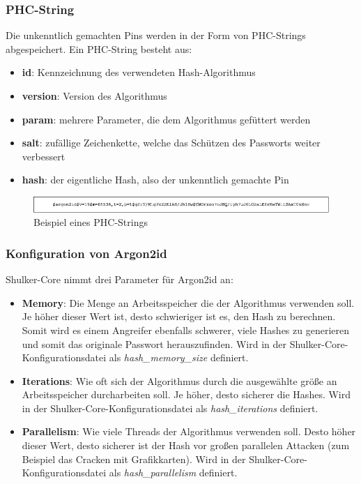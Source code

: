 \subsubsection{PHC-String}
Die unkenntlich gemachten Pins werden in der Form von PHC-Strings abgespeichert. Ein PHC-String besteht aus:
\begin{itemize}
    \item \textbf{id}: Kennzeichnung des verwendeten Hash-Algorithmus
    \item \textbf{version}: Version des Algorithmus
    \item \textbf{param}: mehrere Parameter, die dem Algorithmus gefüttert werden
    \item \textbf{salt}: zufällige Zeichenkette, welche das Schützen des Passworts weiter verbessert
    \item \textbf{hash}: der eigentliche Hash, also der unkenntlich gemachte Pin
\end{itemize}
\begin{figure}[H]
    \begin{center}
        \includegraphics[width=1\textwidth]{images/core/phc_string.png}
        \caption{Beispiel eines PHC-Strings}
    \end{center}
\end{figure}

\subsubsection{Konfiguration von Argon2id}
Shulker-Core nimmt drei Parameter für Argon2id an:

\begin{itemize}
    \item \textbf{Memory}: Die Menge an Arbeitsspeicher die der Algorithmus verwenden soll. Je höher dieser Wert ist,
    desto schwieriger ist es, den Hash zu berechnen. Somit wird es einem Angreifer ebenfalls schwerer, viele Hashes zu generieren
    und somit das originale Passwort herauszufinden. Wird in der Shulker-Core-Konfigurationsdatei als \textit{hash\_memory\_size} definiert.
    \item \textbf{Iterations}: Wie oft sich der Algorithmus durch die ausgewählte größe an Arbeitsspeicher durcharbeiten soll. Je höher, desto
    sicherer die Hashes. Wird in der Shulker-Core-Konfigurationsdatei als \textit{hash\_iterations} definiert.
    \item \textbf{Parallelism}: Wie viele Threads der Algorithmus verwenden soll. Desto höher dieser Wert, desto sicherer ist der Hash
    vor großen parallelen Attacken (zum Beispiel das Cracken mit Grafikkarten). Wird in der Shulker-Core-Konfigurationsdatei als \textit{hash\_parallelism} definiert.
\end{itemize}